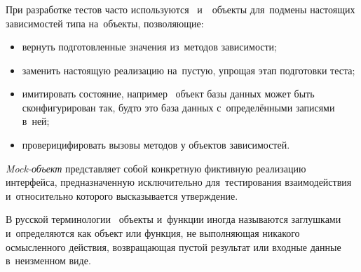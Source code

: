 \subsubsection{}
\label{sec:testing:unit:mock}

При разработке тестов часто используются \mock \, и~\stub \, объекты для~подмены настоящих зависимостей типа на~объекты, позволяющие:

\begin{itemize}
	\item вернуть подготовленные значения из~методов зависимости;
	\item заменить настоящую реализацию на~пустую, упрощая этап подготовки теста;
	\item имитировать состояние, например \stub \, объект базы данных может быть сконфигурирован так, будто это база данных с~определёнными записями в~ней;
	\item проверицифировать вызовы методов у объектов зависимостей.
\end{itemize}

\textit{Mock-объект} представляет собой конкретную фиктивную реализацию интерфейса, предназначенную исключительно для~тестирования взаимодействия и~относительно которого высказывается утверждение\cite{wiki:mock}.

В русской терминологии \stub \, объекты и~функции иногда называются заглушками и~определяются как объект или функция, не выполняющая никакого осмысленного действия, возвращающая пустой результат или входные данные в~неизменном виде\cite{wiki:stub}.